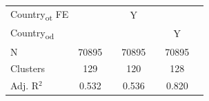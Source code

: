 {\begin{tabular}{l*{3}{cc}}
Country\textsubscript{ot} FE&               &            &           Y   &            &               &            \\
Country\textsubscript{od}&               &            &               &            &           Y   &            \\
\midrule
N           &       70895   &            &       70895   &            &       70895   &            \\
Clusters    &         129   &            &         120   &            &         128   &            \\
Adj. R{$^2$}&       0.532   &            &       0.536   &            &       0.820   &            \\
\bottomrule
\end{tabular}
}
